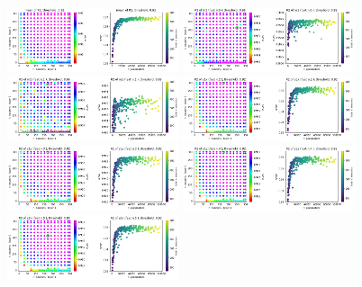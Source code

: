 \documentclass[prd,aps,twocolumn,a4paper,showkeys,nofootinbib]{revtex4-1}
\begin{document}
%
\begin{figure}[t]
  \center
  \includegraphics[width=0.45\textwidth]{./Figs/crossval_v0c0_R2mean.png}
  \hspace{0.3cm}
  \includegraphics[width=0.45\textwidth]{./Figs/crossval_v0c0_R2m1.png} \\
  \includegraphics[width=0.45\textwidth]{./Figs/crossval_v0c0_R2m2.png}
  \hspace{0.3cm}
  \includegraphics[width=0.45\textwidth]{./Figs/crossval_v0c0_R2s1x.png} \\
  \includegraphics[width=0.45\textwidth]{./Figs/crossval_v0c0_R2s1y.png}
  \hspace{0.3cm}
  \includegraphics[width=0.45\textwidth]{./Figs/crossval_v0c0_R2s1z.png} \\
  \includegraphics[width=0.45\textwidth]{./Figs/crossval_v0c0_R2s2x.png} 

\end{figure}
\end{document}
